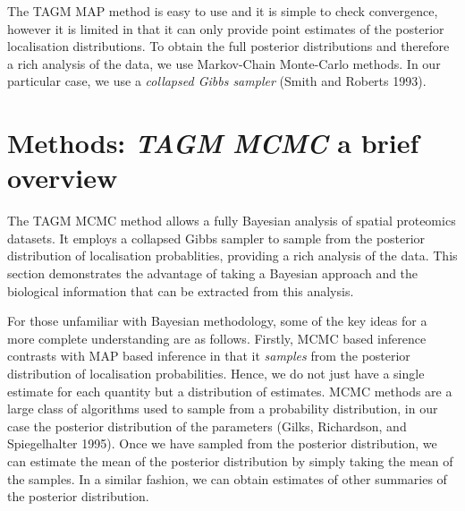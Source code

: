 \documentclass[
]{article}
\begin{document}
The TAGM MAP method is easy to use and it is simple to check
convergence, however it is limited in that it can only provide point
estimates of the posterior localisation distributions. To obtain the
full posterior distributions and therefore a rich analysis of the data,
we use Markov-Chain Monte-Carlo methods. In our particular case, we use
a \emph{collapsed Gibbs sampler} (Smith and Roberts 1993).

\hypertarget{methods-tagm-mcmc-a-brief-overview}{%
\section{\texorpdfstring{Methods: \emph{TAGM MCMC} a brief
overview}{Methods: TAGM MCMC a brief overview}}\label{methods-tagm-mcmc-a-brief-overview}}

The TAGM MCMC method allows a fully Bayesian analysis of spatial
proteomics datasets. It employs a collapsed Gibbs sampler to sample from
the posterior distribution of localisation probablities, providing a
rich analysis of the data. This section demonstrates the advantage of
taking a Bayesian approach and the biological information that can be
extracted from this analysis.

For those unfamiliar with Bayesian methodology, some of the key ideas
for a more complete understanding are as follows. Firstly, MCMC based
inference contrasts with MAP based inference in that it \textit{samples}
from the posterior distribution of localisation probabilities. Hence, we
do not just have a single estimate for each quantity but a distribution
of estimates. MCMC methods are a large class of algorithms used to
sample from a probability distribution, in our case the posterior
distribution of the parameters (Gilks, Richardson, and Spiegelhalter
1995). Once we have sampled from the posterior distribution, we can
estimate the mean of the posterior distribution by simply taking the
mean of the samples. In a similar fashion, we can obtain estimates of
other summaries of the posterior distribution.
\end{document}
